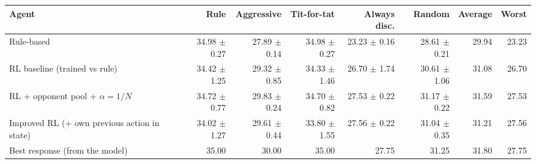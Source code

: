 \begin{tabular}{lrrrrrrr}
\toprule
Agent & Rule & Aggressive & Tit-for-tat & Always disc. & Random & Average & Worst \\
\midrule
Rule-based & 34.98 $\pm$ 0.27 & 27.89 $\pm$ 0.14 & 34.98 $\pm$ 0.27 & 23.23 $\pm$ 0.16 & 28.61 $\pm$ 0.21 & 29.94 & 23.23 \\
RL baseline (trained vs rule) & 34.42 $\pm$ 1.25 & 29.32 $\pm$ 0.85 & 34.33 $\pm$ 1.46 & 26.70 $\pm$ 1.74 & 30.61 $\pm$ 1.06 & 31.08 & 26.70 \\
RL + opponent pool + $\alpha=1/N$ & 34.72 $\pm$ 0.77 & 29.83 $\pm$ 0.24 & 34.70 $\pm$ 0.82 & 27.53 $\pm$ 0.22 & 31.17 $\pm$ 0.22 & 31.59 & 27.53 \\
Improved RL (+ own previous action in state) & 34.02 $\pm$ 1.27 & 29.61 $\pm$ 0.44 & 33.80 $\pm$ 1.55 & 27.56 $\pm$ 0.22 & 31.04 $\pm$ 0.35 & 31.21 & 27.56 \\
Best response (from the model) & 35.00 & 30.00 & 35.00 & 27.75 & 31.25 & 31.80 & 27.75 \\
\bottomrule
\end{tabular}
